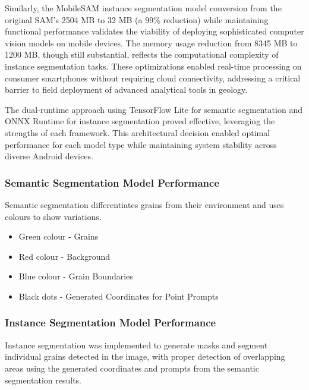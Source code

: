 \documentclass[final-report]{report-template}
\begin{document}
Similarly, the MobileSAM instance segmentation model conversion from the original SAM's 2504 MB to 32 MB (a 99\% reduction) while maintaining functional performance validates the viability of deploying sophisticated computer vision models on mobile devices. The memory usage reduction from 8345 MB to 1200 MB, though still substantial, reflects the computational complexity of instance segmentation tasks. These optimizations enabled real-time processing on consumer smartphones without requiring cloud connectivity, addressing a critical barrier to field deployment of advanced analytical tools in geology.

The dual-runtime approach using TensorFlow Lite for semantic segmentation and ONNX Runtime for instance segmentation proved effective, leveraging the strengths of each framework. This architectural decision enabled optimal performance for each model type while maintaining system stability across diverse Android devices.
\subsubsection{Semantic Segmentation Model Performance}
Semantic segmentation differentiates grains from their environment and uses colours to show variations.


\begin{itemize}
    \item Green colour - Grains
\end{itemize}
\begin{itemize}
    \item Red colour - Background
\end{itemize}
\begin{itemize}
    \item Blue colour - Grain Boundaries
\end{itemize}
\begin{itemize}
    \item Black dots - Generated Coordinates for Point Prompts
\end{itemize}

\subsubsection{Instance Segmentation Model Performance}
Instance segmentation was implemented to generate masks and segment individual grains detected in the image, with proper detection of overlapping areas using the generated coordinates and prompts from the semantic segmentation results. 
\end{document}
